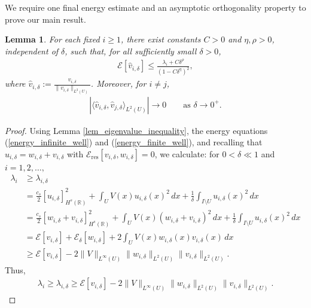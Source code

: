 \documentclass[preprint,12pt]{elsarticle}
\newcommand{\R}{\mathbb R}
\newtheorem{lemma}[theorem]{Lemma}
\begin{document}
We require one final energy estimate and an asymptotic orthogonality
property to prove our main result.
{\begin{lemma}\label{lem_refined_evalue_inequality}
For each fixed $i\geq1$, there exist constants $C>0$ and
$\eta,\rho>0$, independent of $\delta$, such that, for all
sufficiently small $\delta>0$,
\begin{align}\label{final_evalue_inequality}
\mathcal E[\hat v_{i,\delta}]
    \leq
    \frac{\lambda_i+C\delta^\rho}
         {(1-C\delta^\eta)^2},
\end{align}
where
    $\hat v_{i,\delta}
    :=
    \frac{v_{i,\delta}}
         {\|v_{i,\delta}\|_{L^2(U)}}$.
Moreover, for $i\neq j$,
\begin{align}\label{asymptotic_orthogonality_vhat}
    \left|
    \langle
    \hat v_{i,\delta},
    \hat v_{j,\delta}
    \rangle_{L^2(U)}
    \right|
    \longrightarrow0
    \qquad\text{as }\delta\to0^+.
\end{align}
\end{lemma}
\begin{proof}
    Using Lemma \ref{lem_eigenvalue_inequality}, the energy equations (\ref{energy_infinite_well}) and (\ref{energy_finite_well}), and recalling that $u_{i,\delta}=w_{i,\delta}+v_{i,\delta}$ with
    $\mathcal E_{\mathrm{res}}
    [v_{i,\delta},w_{i,\delta}]=0$,
we calculate: for $0<\delta\ll 1$ and $i=1,2,\ldots,$
\begin{align*}
    \lambda_i
    &\geq \lambda_{i,\delta}\\
    &=
    \frac{c_s}{2}[u_{i,\delta}]^2_{H^s(\R)}
    +\int_U V(x)u_{i,\delta}(x)^2\,dx
    +\frac{1}{\delta}
     \int_{I\setminus U}u_{i,\delta}(x)^2\,dx\\
    &=
    \frac{c_s}{2}[w_{i,\delta}+v_{i,\delta}]^2_{H^s(\R)}
    +\int_U V(x)
       \left(w_{i,\delta}+v_{i,\delta}\right)^2\,dx
    +\frac{1}{\delta}
     \int_{I\setminus U}u_{i,\delta}(x)^2\,dx\\
    &=
    \mathcal E[v_{i,\delta}]
    +\mathcal E_\delta[w_{i,\delta}]
    +2\int_U
      V(x)w_{i,\delta}(x)v_{i,\delta}(x)\,dx\\
    &\geq
    \mathcal E[v_{i,\delta}]
    -2\|V\|_{L^\infty(U)}
      \|w_{i,\delta}\|_{L^2(U)}
      \|v_{i,\delta}\|_{L^2(U)}.
\end{align*} 
Thus,
\begin{align}\label{evalue_inequality_induction}
    \lambda_i
    \geq\lambda_{i,\delta}
    \geq
    \mathcal E[v_{i,\delta}]
    -2\|V\|_{L^\infty(U)}
      \|w_{i,\delta}\|_{L^2(U)}
      \|v_{i,\delta}\|_{L^2(U)}.
\end{align}


\end{proof}}
\end{document}
